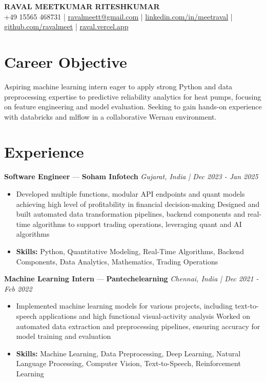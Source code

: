 \documentclass[a4paper,10pt]{article}
\begin{document}
\begin{center}
  {\Large\bfseries RAVAL MEETKUMAR RITESHKUMAR}\\[2pt]
  {\small +49 15565 468731 \;|\; \href{mailto:ravalmeett@gmail.com}{ravalmeett@gmail.com} \;|\; \href{https://www.linkedin.com/in/meetraval/}{linkedin.com/in/meetraval} \;|\; \href{https://github.com/ravalmeet}{github.com/ravalmeet} \;|\; \href{https://raval.vercel.app/}{raval.vercel.app}}
\end{center}
\vspace{-3pt}

\section*{Career Objective}
Aspiring machine learning intern eager to apply strong Python and data preprocessing expertise to predictive reliability analytics for heat pumps, focusing on feature engineering and model evaluation. Seeking to gain hands-on experience with databricks and mlflow in a collaborative Wernau environment.\par

\section*{Experience}
\textbf{Software Engineer} — \textbf{Soham Infotech} \hfill \textit{Gujarat, India \;|\; Dec 2023 - Jan 2025}\par
\vspace{1pt}
\begin{itemize}
  \item Developed multiple functions, modular API endpoints and quant models achieving high level of profitability in financial decision-making Designed and built automated data transformation pipelines, backend components and real-time algorithms to support trading operations, leveraging quant and AI algorithms
  \item \textbf{Skills:} Python, Quantitative Modeling, Real-Time Algorithms, Backend Components, Data Analytics, Mathematics, Trading Operations
\end{itemize}
\vspace{3pt}
\textbf{Machine Learning Intern} — \textbf{Pantechelearning} \hfill \textit{Chennai, India \;|\; Dec 2021 - Feb 2022}\par
\vspace{1pt}
\begin{itemize}
  \item Implemented machine learning models for various projects, including text-to-speech applications and high functional visual-activity analysis Worked on automated data extraction and preprocessing pipelines, ensuring accuracy for model training and evaluation
  \item \textbf{Skills:} Machine Learning, Data Preprocessing, Deep Learning, Natural Language Processing, Computer Vision, Text-to-Speech, Reinforcement Learning
\end{itemize}
\end{document}
